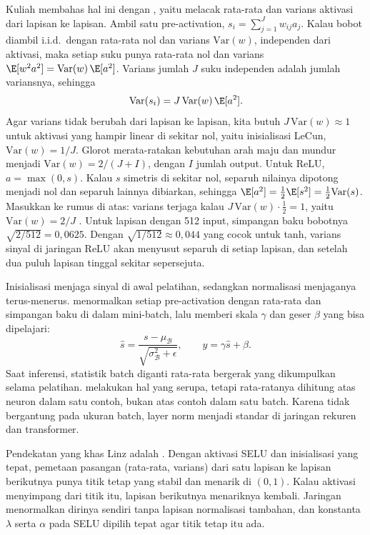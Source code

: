 Kuliah membahas hal ini dengan , yaitu melacak rata-rata dan varians
aktivasi dari lapisan ke lapisan. Ambil satu pre-activation, $s_i=\sum_{j=1}^Jw_{ij}a_j$. Kalau bobot
diambil i.i.d.\ dengan rata-rata nol dan varians $\mathrm{Var}(w)$, independen dari aktivasi, maka setiap
suku punya rata-rata nol dan varians $\E[w^2a^2]=\mathrm{Var}(w)\,\E[a^2]$. Varians jumlah $J$ suku
independen adalah jumlah variansnya, sehingga
\begin{equation}
\mathrm{Var}(s_i)=J\,\mathrm{Var}(w)\,\E[a^2].
\end{equation}
Agar varians tidak berubah dari lapisan ke lapisan, kita butuh $J\,\mathrm{Var}(w)\approx1$
untuk aktivasi yang hampir linear di sekitar nol, yaitu inisialisasi LeCun,
$\mathrm{Var}(w)=1/J$. Glorot merata-ratakan kebutuhan arah maju dan mundur menjadi
$\mathrm{Var}(w)=2/(J+I)$, dengan $I$ jumlah output. Untuk ReLU, $a=\max(0,s)$. Kalau $s$ simetris di
sekitar nol, separuh nilainya dipotong menjadi nol dan separuh lainnya dibiarkan, sehingga
$\E[a^2]=\tfrac12\E[s^2]=\tfrac12\mathrm{Var}(s)$. Masukkan ke rumus di atas: varians terjaga kalau
$J\,\mathrm{Var}(w)\cdot\tfrac12=1$, yaitu $\mathrm{Var}(w)=2/J$ \citep{he2015}. Untuk lapisan dengan
512 input, simpangan baku bobotnya $\sqrt{2/512}=0{,}0625$. Dengan $\sqrt{1/512}\approx0{,}044$ yang
cocok untuk tanh, varians sinyal di jaringan ReLU akan menyusut separuh di setiap lapisan, dan setelah
dua puluh lapisan tinggal sekitar sepersejuta.

Inisialisasi menjaga sinyal di awal pelatihan, sedangkan normalisasi menjaganya terus-menerus.
 \citep{ioffe2015} menormalkan setiap pre-activation dengan rata-rata dan
simpangan baku di dalam mini-batch, lalu memberi skala $\gamma$ dan geser $\beta$ yang bisa
dipelajari:
\begin{equation}
\hat s=\frac{s-\mu_{\mathcal B}}{\sqrt{\sigma_{\mathcal B}^2+\epsilon}},\qquad y=\gamma\hat s+\beta.
\end{equation}
Saat inferensi, statistik batch diganti rata-rata bergerak yang dikumpulkan selama pelatihan.
 melakukan hal yang serupa, tetapi rata-ratanya dihitung atas neuron
dalam satu contoh, bukan atas contoh dalam satu batch. Karena tidak bergantung pada ukuran batch,
layer norm menjadi standar di jaringan rekuren dan transformer.

Pendekatan yang khas Linz adalah  \citep{klambauer2017}.
Dengan aktivasi SELU dan inisialisasi yang tepat, pemetaan pasangan (rata-rata, varians) dari
satu lapisan ke lapisan berikutnya punya titik tetap yang stabil dan menarik di $(0,1)$. Kalau
aktivasi menyimpang dari titik itu, lapisan berikutnya menariknya kembali. Jaringan menormalkan
dirinya sendiri tanpa lapisan normalisasi tambahan, dan konstanta $\lambda$ serta $\alpha$
pada SELU dipilih tepat agar titik tetap itu ada.

